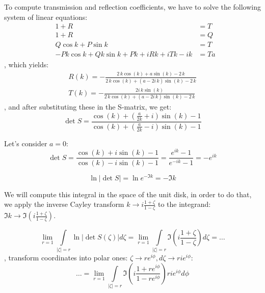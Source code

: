 \documentclass{birkjour}
\theoremstyle{definition}
\theoremstyle{remark}
\numberwithin{equation}{section}
\begin{document}
To compute transmission and reflection coefficients, we have to solve the following system of linear equations:
\begin{align*}
& 1 + R &= T \\
& 1 + R &= Q \\
& Q \cos k + P \sin k &= T \\
& -P k \cos k + Q k \sin k + P k + i R k + i T k - i k &= T a
\end{align*}
, which yields:
\begin{align*}
R(k) = -\frac{2 \, k \cos\left(k\right) + a \sin\left(k\right) - 2 \, k}{2 \, k \cos\left(k\right) + {\left(a - 2 i \, k\right)} \sin\left(k\right) - 2 \, k} \\
T(k) = -\frac{2 i \, k \sin\left(k\right)}{2 \, k \cos\left(k\right) + {\left(a - 2 i \, k\right)} \sin\left(k\right) - 2 \, k}
\end{align*}
, and after substituting these in the S-matrix, we get:
\[
\det S = 
\frac
{\cos\left(k\right) + {\left(\frac{a}{2 k} + i\right)} \sin\left(k\right) - 1}
{\cos\left(k\right) + {\left(\frac{a}{2 k} - i\right)} \sin\left(k\right) - 1}
\]


Let's consider $a=0$:
\[
\det S
= \frac
{\cos\left(k\right) + i \sin\left(k\right) - 1}
{\cos\left(k\right) - i \sin\left(k\right) - 1}
= \frac{e^{i k} - 1}{e^{-i k} - 1}
= -e^{i k}
\]

\[
\ln \left|{\det S}\right| = \ln e^{- \Im k} = -\Im k
\]

We will compute this integral in the space of the unit disk, in order to do that, we apply the inverse Cayley transform $k \to i \frac{1 + \zeta}{1 - \zeta}$ to the integrand: $\Im k \to \Im \left( i \frac{1 + \zeta}{1 - \zeta} \right) $.

\[
  \lim\limits_{r = 1} \int\limits_{\left|\zeta\right| = r} \ln \left|\det S(\zeta)\right| d \zeta
= \lim\limits_{r = 1} \int\limits_{\left|\zeta\right| = r} \Im \left( i \frac{1 + \zeta}{1 - \zeta} \right)  d\zeta = \dots
\]
, transform coordinates into polar ones: $\zeta \to r e^{i \phi}, d\zeta \to r i e^{i \phi}$:
\[
\dots = \lim\limits_{r = 1} \int\limits_{\left|\zeta\right| = r} \Im \left( i \frac{1 + r e^{i \phi}}{1 - r e^{i \phi}} \right) r i e^{i \phi} d\phi
\]
\end{document}
